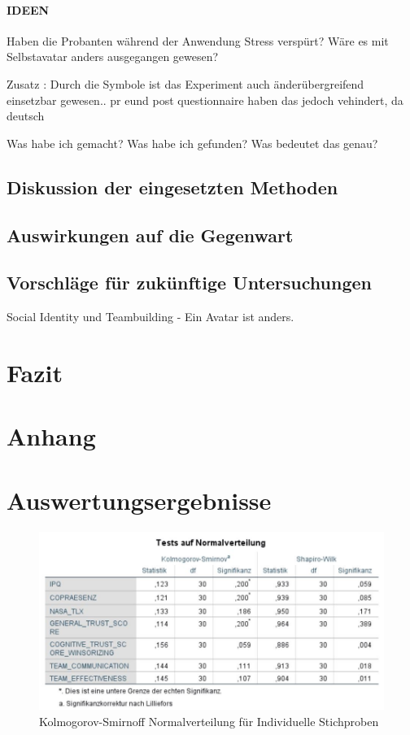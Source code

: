 \documentclass[a4paper,11pt]{article}%
\renewcommand{\\}{\vspace*{0.5\baselineskip} \newline}
\begin{document}
\paragraph{IDEEN}
Haben die Probanten während der Anwendung Stress verspürt?
Wäre es mit Selbstavatar anders ausgegangen gewesen?

Zusatz :
Durch die Symbole ist das Experiment auch änderübergreifend einsetzbar gewesen.. pr eund post questionnaire haben das jedoch vehindert, da deutsch

	Was habe ich gemacht?
	Was habe ich gefunden? 
	Was bedeutet das genau?
	\subsection{Diskussion der eingesetzten Methoden}
	\subsection{Auswirkungen auf die Gegenwart}
	\subsection{Vorschläge für zukünftige Untersuchungen}
		Social Identity und Teambuilding - Ein Avatar ist anders.
	
\section{Fazit}
\newpage




	\newpage
	\appendix	
\section*{Anhang}

\section{Auswertungsergebnisse}
	
	\begin{figure}[H]
	\centering
		\begin{footnotesize}
			\includegraphics[scale=0.6]{Abbildungen/Post_QuestionnaireStatistiks/Normalverteilung_30}\\
			\caption{Kolmogorov-Smirnoff Normalverteilung für Individuelle Stichproben}
			\label{fig:KolSmirInd}
		\end{footnotesize}
	\end{figure}	
	
\end{document}
